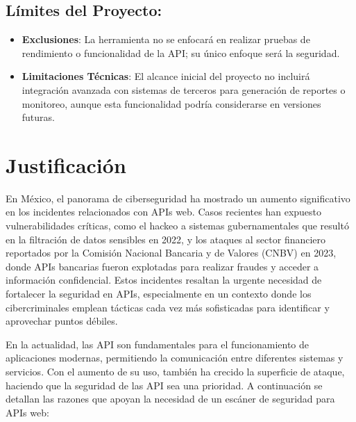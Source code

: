 \documentclass{article}
\begin{document}
    \subsection{Límites del Proyecto:}
    \begin{itemize}
        \item \textbf{Exclusiones}: La herramienta no se enfocará en realizar pruebas de rendimiento o funcionalidad de la API; su único enfoque será la seguridad.
        \item \textbf{Limitaciones Técnicas}: El alcance inicial del proyecto no incluirá integración avanzada con sistemas de terceros para generación de reportes o monitoreo, aunque esta funcionalidad podría considerarse en versiones futuras.
    \end{itemize}

    \section{Justificación}

    En México, el panorama de ciberseguridad ha mostrado un aumento significativo en los incidentes relacionados con APIs web. Casos recientes han expuesto vulnerabilidades críticas, como el hackeo a sistemas gubernamentales que resultó en la filtración de datos sensibles en 2022, y los ataques al sector financiero reportados por la Comisión Nacional Bancaria y de Valores (CNBV) en 2023, donde APIs bancarias fueron explotadas para realizar fraudes y acceder a información confidencial. Estos incidentes resaltan la urgente necesidad de fortalecer la seguridad en APIs, especialmente en un contexto donde los cibercriminales emplean tácticas cada vez más sofisticadas para identificar y aprovechar puntos débiles.

    En la actualidad, las API son fundamentales para el funcionamiento de aplicaciones modernas, permitiendo la comunicación entre diferentes sistemas y servicios. Con el aumento de su uso, también ha crecido la superficie de ataque, haciendo que la seguridad de las API sea una prioridad. A continuación se detallan las razones que apoyan la necesidad de un escáner de seguridad para APIs web:
\end{document}
